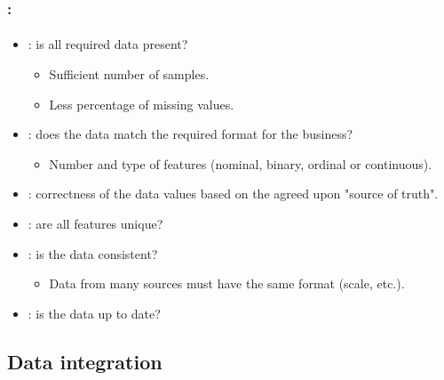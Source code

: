 \documentclass[xcolor=table]{beamer}
\begin{document}
\begin{frame}
	\frametitle{\insertshortsubtitle: \insertsection}
	\framesubtitle{\insertsubsection}
	
	\begin{itemize}
		\item {}: is all required data present?
		\begin{itemize}
			\item Sufficient number of samples.
			\item Less percentage of missing values.
		\end{itemize}
		\item {}: does the data match the required format for the business?
		\begin{itemize}
			\item Number and type of features (nominal, binary, ordinal or continuous).
		\end{itemize}
		\item {}: correctness of the data values based on the agreed upon "source of truth".
		\item {}: are all features unique?
		\item {}: is the data consistent?
		\begin{itemize}
			\item Data from many sources must have the same format (scale, etc.).
		\end{itemize}
		\item {}: is the data up to date?
	\end{itemize}

\end{frame}


\subsection{Data integration}
\end{document}
